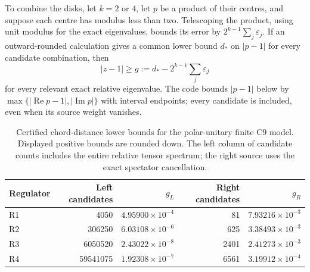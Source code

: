 To combine the disks, let $k=2$ or $4$, let $p$ be a product of their centres, and suppose each centre has modulus less than two. Telescoping the product, using unit modulus for the exact eigenvalues, bounds its error by $2^{k-1}\sum_j\varepsilon_j$. If an outward-rounded calculation gives a common lower bound $d_*$ on $|p-1|$ for every candidate combination, then
\begin{equation}\label{eq:certified-chord-gap}
|z-1|\geq g:=d_*-2^{k-1}\sum_j\varepsilon_j
\end{equation}
for every relevant exact relative eigenvalue. The code bounds $|p-1|$ below by $\max\{|\operatorname{Re}p-1|,|\operatorname{Im}p|\}$ with interval endpoints; every candidate is included, even when its source weight vanishes.

\begin{table}[htbp]\centering\small
\caption{Certified chord-distance lower bounds for the polar-unitary finite C9 model. Displayed positive bounds are rounded down. The left column of candidate counts includes the entire relative tensor spectrum; the right source uses the exact spectator cancellation.}\label{tab:operator-gaps}
\begin{tabular}{@{}lrrrr@{}}\toprule
Regulator & Left candidates & $g_L$ & Right candidates & $g_R$\\\midrule
R1 & 4050 & $4.95900\times10^{-4}$ & 81 & $7.93216\times10^{-3}$\\
R2 & 306250 & $6.03108\times10^{-6}$ & 625 & $3.38493\times10^{-3}$\\
R3 & 6050520 & $2.43022\times10^{-8}$ & 2401 & $2.41273\times10^{-3}$\\
R4 & 59541075 & $1.92308\times10^{-7}$ & 6561 & $3.19912\times10^{-4}$\\
\bottomrule\end{tabular}
\end{table}

